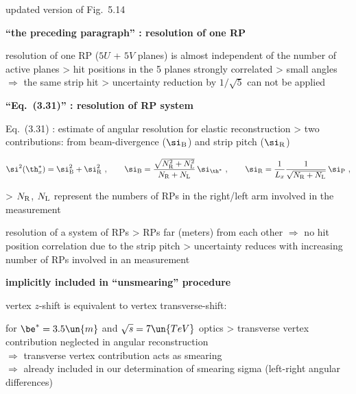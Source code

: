 \> updated version of Fig.~5.14


\newpage%


\centerline{\bf ``the preceding paragraph'' : resolution of one RP}

\> resolution of one RP ($5U$ + $5V$ planes) is almost independent of the number of active planes
\>> hit positions in the 5 planes strongly correlated
\>> small angles $\Rightarrow$ the same strip hit
\>> uncertainty reduction by $1/\sqrt5$ can not be applied

\vfil
\centerline{\bf ``Eq.~(3.31)'' : resolution of RP system}

\> Eq.~(3.31) : estimate of angular resolution for elastic reconstruction
\>> two contributions: from beam-divergence ($\si_{\rm B}$) and strip pitch ($\si_{\rm R}$)

$$
	\si^2(\th_x^*) =  \si_{\rm B}^2 + \si_{\rm R}^2\ ,\qquad
	\si_{\rm B} = {\sqrt{N_{\rm R}^2 + N_{\rm L}^2} \over N_{\rm R} + N_{\rm L}}\, \si_{\th^*}\ ,\qquad
	\si_{\rm R} = {1\over L_x} {1\over \sqrt{N_{\rm R} + N_{\rm L}}}\, \si_{\rm P}\ ,
$$

\>> $N_{\rm R}$, $N_{\rm L}$ represent the numbers of RPs in the right/left arm involved in the measurement

\bls

\> resolution of a system of RPs
\>> RPs far (meters) from each other $\Rightarrow$ no hit position correlation due to the strip pitch
\>> uncertainty reduces with increasing number of RPs involved in an measurement



\newpage%
\vskip2mm

\centerline{\bf implicitly included in ``unsmearing'' procedure}

\> vertex $z$-shift is equivalent to vertex transverse-shift:


\> for $\be^* = 3.5\un{m}$ and $\sqrt s = 7\un{TeV}$ optics
\>> transverse vertex contribution neglected in angular reconstruction\\
$\Rightarrow$ transverse vertex contribution acts as smearing\\
$\Rightarrow$ already included in our determination of smearing sigma (left-right angular differences)

